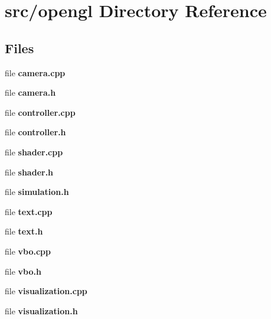 \section{src/opengl Directory Reference}
\label{dir_e3787dfdbc46fad3e6d80e1f98f95a2e}
\subsection*{Files}
\begin{DoxyCompactItemize}
\item 
file {\bfseries camera.\-cpp}
\item 
file {\bfseries camera.\-h}
\item 
file {\bfseries controller.\-cpp}
\item 
file {\bfseries controller.\-h}
\item 
file {\bfseries shader.\-cpp}
\item 
file {\bfseries shader.\-h}
\item 
file {\bfseries simulation.\-h}
\item 
file {\bfseries text.\-cpp}
\item 
file {\bfseries text.\-h}
\item 
file {\bf vbo.\-cpp}
\item 
file {\bf vbo.\-h}
\item 
file {\bfseries visualization.\-cpp}
\item 
file {\bfseries visualization.\-h}
\end{DoxyCompactItemize}
